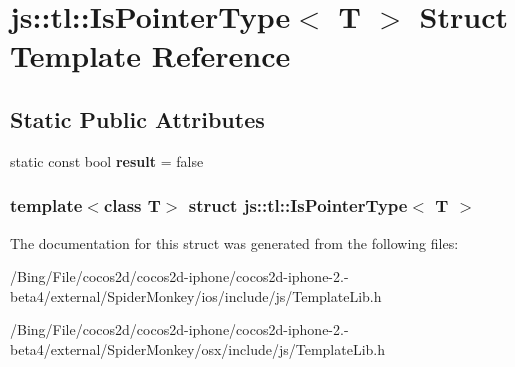 \hypertarget{structjs_1_1tl_1_1_is_pointer_type}{\section{js\-:\-:tl\-:\-:Is\-Pointer\-Type$<$ T $>$ Struct Template Reference}
\label{structjs_1_1tl_1_1_is_pointer_type}
}
\subsection*{Static Public Attributes}
\begin{DoxyCompactItemize}
\item 
\hypertarget{structjs_1_1tl_1_1_is_pointer_type_a570c95fb267a44ebdb06a68ecd60e837}{static const bool {\bfseries result} = false}\label{structjs_1_1tl_1_1_is_pointer_type_a570c95fb267a44ebdb06a68ecd60e837}

\end{DoxyCompactItemize}
\subsubsection*{template$<$class T$>$ struct js\-::tl\-::\-Is\-Pointer\-Type$<$ T $>$}



The documentation for this struct was generated from the following files\-:\begin{DoxyCompactItemize}
\item 
/\-Bing/\-File/cocos2d/cocos2d-\/iphone/cocos2d-\/iphone-\/2.-\/beta4/external/\-Spider\-Monkey/ios/include/js/Template\-Lib.\-h\item 
/\-Bing/\-File/cocos2d/cocos2d-\/iphone/cocos2d-\/iphone-\/2.-\/beta4/external/\-Spider\-Monkey/osx/include/js/Template\-Lib.\-h\end{DoxyCompactItemize}
